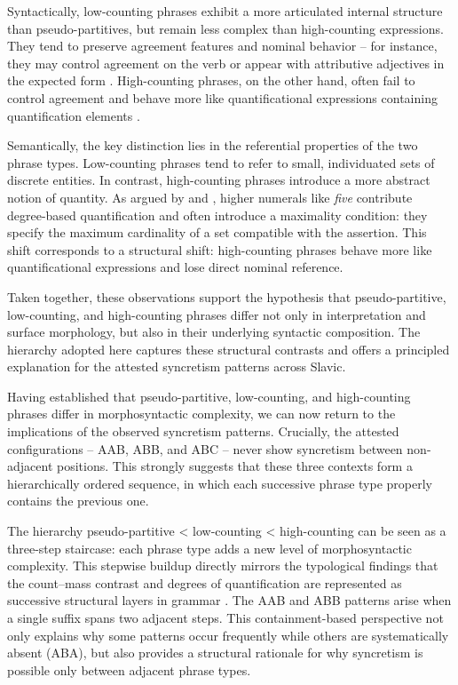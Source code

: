 \documentclass[output=paper,colorlinks,citecolor=brown
]{langscibook}
\begin{document}
Syntactically, low-counting phrases exhibit a more articulated internal structure than pseudo-partitives, but remain less complex than high-counting expressions. They tend to preserve agreement features and nominal behavior -- for instance, they may control agreement on the verb or appear with attributive adjectives in the expected form \citep{Franks1995}. High-counting phrases, on the other hand, often fail to control agreement and behave more like quantificational expressions containing quantification elements \citep{Pesetsky2013}.

Semantically, the key distinction lies in the referential properties of the two phrase types. Low-counting phrases tend to refer to small, individuated sets of discrete entities. In contrast, high-counting phrases introduce a more abstract notion of quantity. As argued by \citet{bylininanouwen2020} and \citet{kennedysyrett2020}, higher numerals like \textit{five} contribute degree-based quantification and often introduce a maximality condition: they specify the maximum cardinality of a set compatible with the assertion. This shift corresponds to a structural shift: high-counting phrases behave more like quantificational expressions and lose direct nominal reference.

Taken together, these observations support the hypothesis that pseudo-partitive, low-counting, and high-counting phrases differ not only in interpretation and surface morphology, but also in their underlying syntactic composition. The hierarchy adopted here captures these structural contrasts and offers a principled explanation for the attested syncretism patterns across Slavic.

Having established that pseudo-partitive, low-counting, and high-counting phrases differ in morphosyntactic complexity, we can now return to the implications of the observed syncretism patterns. Crucially, the attested configurations -- AAB, ABB, and ABC -- never show syncretism between non-adjacent positions. This strongly suggests that these three contexts form a hierarchically ordered sequence, in which each successive phrase type properly contains the previous one.

The hierarchy pseudo-partitive < low-counting < high-counting can be seen as a three-step staircase: each phrase type adds a new level of morphosyntactic complexity. This stepwise buildup directly mirrors the typological findings that the count–mass contrast and degrees of quantification are represented as successive structural layers in grammar \citep{Doetjes2017}. The AAB and ABB patterns arise when a single suffix spans two adjacent steps. This containment-based perspective not only explains why some patterns occur frequently while others are systematically absent (ABA), but also provides a structural rationale for why syncretism is possible only between adjacent phrase types.
\end{document}
